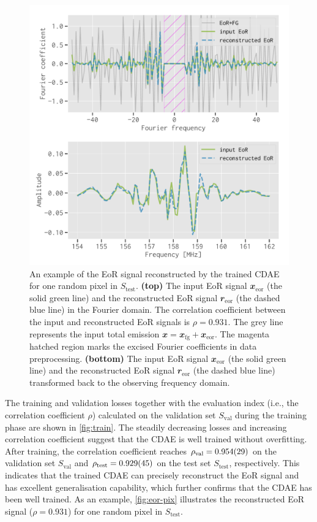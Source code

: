 \documentclass[fleqn,usenatbib]{mnras}
\newlength{\myfigwidth}
\newcommand{\R}[1]{\mathrm{#1}}
\newcommand{\B}[1]{\mathbfit{#1}}
\newcommand{\editwip}[1]{{\leavevmode\color{magenta}#1}}
\begin{document}
\begin{figure}
  \centering
  \includegraphics[width=\myfigwidth]{eor-result}
  \caption{\label{fig:eor-pix}%
    An example of the EoR signal reconstructed by the trained CDAE for
    one random pixel \editwip{in $S_{\R{test}}$}.
    \textbf{(top)} The input EoR signal $\B{x}_{\R{eor}}$ (the solid
    green line) and the reconstructed EoR signal $\B{r}_{\R{eor}}$
    (the dashed blue line) in the Fourier domain.
    \editwip{The correlation coefficient between the input and
      reconstructed EoR signals is $\rho = 0.931$.}
    The grey line represents the input total emission
    $\B{x} = \B{x}_{\R{fg}} + \B{x}_{\R{eor}}$.
    The magenta hatched region marks the excised Fourier coefficients
    in data preprocessing.
    \textbf{(bottom)} The input EoR signal $\B{x}_{\R{eor}}$ (the solid
    green line) and the reconstructed EoR signal $\B{r}_{\R{eor}}$
    (the dashed blue line) transformed back to the observing frequency
    domain.
  }
\end{figure}

The training and validation losses together with the evaluation index
(i.e., the correlation coefficient $\rho$) calculated on the validation set
$S_{\R{val}}$ during the training phase are shown in \autoref{fig:train}.
The steadily decreasing losses and increasing correlation coefficient
suggest that the CDAE is well trained without overfitting.
\editwip{%
After training, the correlation coefficient reaches
$\rho_{\R{val}} = \num{0.954 +- 0.029}$ on the validation set
$S_{\R{val}}$ and $\rho_{\R{test}} = \num{0.929 +- 0.045}$ on the test set
$S_{\R{test}}$, respectively.
This indicates that the trained CDAE can precisely reconstruct the EoR
signal and has excellent generalisation capability, which further confirms
that the CDAE has been well trained.} %
As an example, \autoref{fig:eor-pix} illustrates the reconstructed EoR
signal (\editwip{$\rho = 0.931$}) for one random pixel
\editwip{in $S_{\R{test}}$}.
\end{document}
